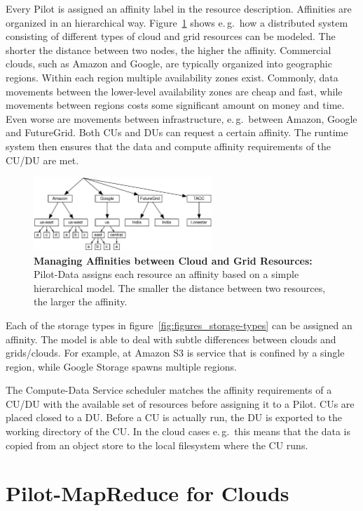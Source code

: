 \documentclass[times]{cpeauth}
\newcommand{\pilot}{Pilot\xspace}
\newcommand{\pilotdata}{Pilot-Data\xspace}
\newcommand{\computedataservice}{Compute-Data Service\xspace}
\newcommand{\du}{DU\xspace}
\newcommand{\dus}{DUs\xspace}
\newcommand{\cu}{CU\xspace}
\newcommand{\cus}{CUs\xspace}
\begin{document}
Every \pilot is assigned an affinity label in the resource description.
Affinities are organized in an hierarchical way.
Figure~\ref{fig:figures_affinities} shows e.\,g.\ how a distributed system
consisting of different types of cloud and grid resources can be modeled. The
shorter the distance between two nodes, the higher the affinity. Commercial
clouds, such as Amazon and Google, are typically organized into geographic
regions. Within each region multiple availability zones exist. Commonly, data
movements between the lower-level availability zones are cheap and fast, while
movements between regions costs some significant amount on money and time.
Even worse are movements between infrastructure, e.\,g.\ between Amazon,
Google and FutureGrid. Both \cus and \dus can request a certain affinity. The 
runtime system then ensures that the data and compute affinity requirements of 
the \cu/\du are met.


\begin{figure}[t]
	\centering
		\includegraphics[width=0.6\textwidth]{figures/affinities.pdf}
	\caption{\textbf{Managing Affinities between Cloud and Grid Resources:} \pilotdata assigns each resource an affinity based on a simple hierarchical model. The smaller the distance between two resources, the larger the affinity.}
	\label{fig:figures_affinities}
\end{figure}

Each of the storage types in figure~\ref{fig:figures_storage-types} can be 
assigned an affinity. The model is able to deal with subtle differences 
between clouds and grids/clouds. For example, at Amazon S3 is service that is 
confined by a single region, while Google Storage spawns multiple regions.

The \computedataservice scheduler matches the affinity requirements of
a \cu/\du with the available set of resources before assigning it to a
\pilot.  \cus are placed closed to a \du. Before a \cu is actually
run, the \du is exported to the working directory of the \cu. In the
cloud cases e.\,g.\ this means that the data is copied from an object
store to the local filesystem where the \cu runs.


\section{Pilot-MapReduce for Clouds}
\end{document}
